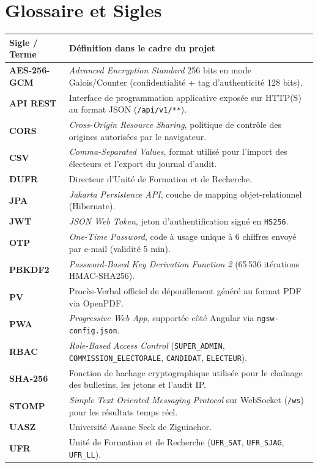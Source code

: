 \documentclass[11pt,a4paper]{report}
\begin{document}
\chapter*{Glossaire et Sigles}
\begin{table}[H]
\centering
\small
\begin{tabularx}{\textwidth}{@{}lX@{}}
\toprule
\rowcolor{uaszlight}
\textbf{Sigle / Terme} & \textbf{Définition dans le cadre du projet} \\
\midrule
\textbf{AES-256-GCM} & \textit{Advanced Encryption Standard} 256 bits en mode Galois/Counter (confidentialité + tag d'authenticité 128 bits). \\
\textbf{API REST} & Interface de programmation applicative exposée sur HTTP(S) au format JSON (\texttt{/api/v1/**}). \\
\textbf{CORS} & \textit{Cross-Origin Resource Sharing}, politique de contrôle des origines autorisées par le navigateur. \\
\textbf{CSV} & \textit{Comma-Separated Values}, format utilisé pour l'import des électeurs et l'export du journal d'audit. \\
\textbf{DUFR} & Directeur d'Unité de Formation et de Recherche. \\
\textbf{JPA} & \textit{Jakarta Persistence API}, couche de mapping objet-relationnel (Hibernate). \\
\textbf{JWT} & \textit{JSON Web Token}, jeton d'authentification signé en \texttt{HS256}. \\
\textbf{OTP} & \textit{One-Time Password}, code à usage unique à 6 chiffres envoyé par e-mail (validité 5 min). \\
\textbf{PBKDF2} & \textit{Password-Based Key Derivation Function 2} (65\,536 itérations HMAC-SHA256). \\
\textbf{PV} & Procès-Verbal officiel de dépouillement généré au format PDF via OpenPDF. \\
\textbf{PWA} & \textit{Progressive Web App}, supportée côté Angular via \texttt{ngsw-config.json}. \\
\textbf{RBAC} & \textit{Role-Based Access Control} (\texttt{SUPER\_ADMIN}, \texttt{COMMISSION\_ELECTORALE}, \texttt{CANDIDAT}, \texttt{ELECTEUR}). \\
\textbf{SHA-256} & Fonction de hachage cryptographique utilisée pour le chaînage des bulletins, les jetons et l'audit IP. \\
\textbf{STOMP} & \textit{Simple Text Oriented Messaging Protocol} sur WebSocket (\texttt{/ws}) pour les résultats temps réel. \\
\textbf{UASZ} & Université Assane Seck de Ziguinchor. \\
\textbf{UFR} & Unité de Formation et de Recherche (\texttt{UFR\_SAT}, \texttt{UFR\_SJAG}, \texttt{UFR\_LL}). \\
\bottomrule
\end{tabularx}
\end{table}
\end{document}
